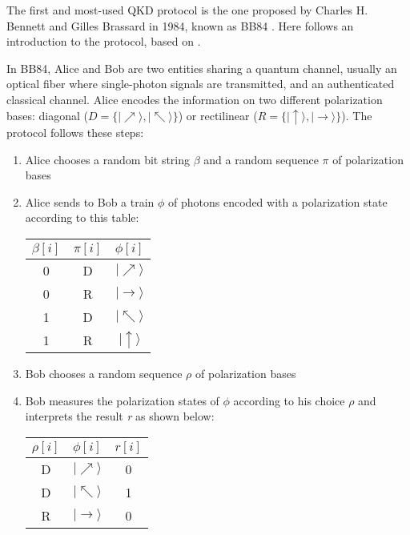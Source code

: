 The first and most-used QKD protocol is the one proposed by Charles H. Bennett and Gilles Brassard in 1984, known as BB84 \cite{bb84}. Here follows an introduction to the protocol, based on \cite{gagliano}.

\label{ch1:bb84}
In BB84, Alice and Bob are two entities sharing a quantum channel, usually an optical fiber where single-photon signals are transmitted, and an authenticated classical channel. Alice encodes the information on two different polarization bases: diagonal ($D = \{|\nearrow\rangle, |\nwarrow\rangle\}$) or rectilinear ($R = \{|\uparrow\rangle, |\rightarrow\rangle\}$). The protocol follows these steps:

\begin{enumerate}
    \item Alice chooses a random bit string $\beta$ and a random sequence $\pi$ of polarization bases
    \item Alice sends to Bob a train $\phi$ of photons encoded with a polarization state according to this table:
    \begin{table}[H]
    \centering 
        \begin{tabular}{| c | c | c |}
        \hline
        $\beta[i]$ & $\pi[i]$ & $\phi[i]$\\
        \hline \hline
        0 & D & $|\nearrow\rangle$\\\hline
        0 & R & $|\rightarrow\rangle$\\\hline
        1 & D & $|\nwarrow\rangle$\\\hline
        1 & R & $|\uparrow\rangle$\\\hline
        \end{tabular}
    \end{table}
    \item Bob chooses a random sequence $\rho$ of polarization bases
    \item Bob measures the polarization states of $\phi$ according to his choice $\rho$ and interprets the result \textit{r} as shown below:
    \begin{table}[H]
    \centering 
        \begin{tabular}{| c | c | c |}
        \hline
        $\rho[i]$ & $\phi[i]$ & $r[i]$\\
        \hline \hline
        D & $|\nearrow\rangle$ & 0\\\hline
        D & $|\nwarrow\rangle$ & 1\\\hline
        R & $|\rightarrow\rangle$ & 0\\\hline

\end{tabular}
\end{table}
\end{enumerate}
